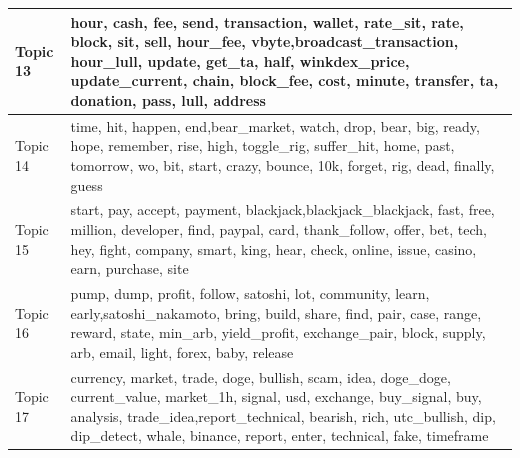 \documentclass[
]{article}
\begin{document}
\begin{table}
\begin{tabular}[t]{l|l}
\hline
Topic 13 & hour,                 cash,                  fee,                 send,          transaction,               wallet,             rate\_sit,                 rate,                block,                  sit,                 sell,             hour\_fee,                vbyte,broadcast\_transaction,            hour\_lull,               update,               get\_ta,                 half,        winkdex\_price,       update\_current,                chain,            block\_fee,                 cost,               minute,             transfer,                   ta,             donation,                 pass,                 lull,              address\\
\hline
Topic 14 & time,        hit,     happen,        end,bear\_market,      watch,       drop,       bear,        big,      ready,       hope,   remember,       rise,       high, toggle\_rig, suffer\_hit,       home,       past,   tomorrow,         wo,        bit,      start,      crazy,     bounce,        10k,     forget,        rig,       dead,    finally,      guess\\
\hline
Topic 15 & start,                pay,             accept,            payment,          blackjack,blackjack\_blackjack,               fast,               free,            million,          developer,               find,             paypal,               card,       thank\_follow,              offer,                bet,               tech,                hey,              fight,            company,              smart,               king,               hear,              check,             online,              issue,             casino,               earn,           purchase,               site\\
\hline
Topic 16 & pump,            dump,          profit,          follow,         satoshi,             lot,       community,           learn,           early,satoshi\_nakamoto,           bring,           build,           share,            find,            pair,            case,           range,          reward,           state,         min\_arb,    yield\_profit,   exchange\_pair,           block,          supply,             arb,           email,           light,           forex,            baby,         release\\
\hline
Topic 17 & currency,          market,           trade,            doge,         bullish,            scam,            idea,       doge\_doge,   current\_value,       market\_1h,          signal,             usd,        exchange,      buy\_signal,             buy,        analysis,      trade\_idea,report\_technical,         bearish,            rich,     utc\_bullish,             dip,      dip\_detect,           whale,         binance,          report,           enter,       technical,            fake,       timeframe\\

\end{tabular}
\end{table}
\end{document}
